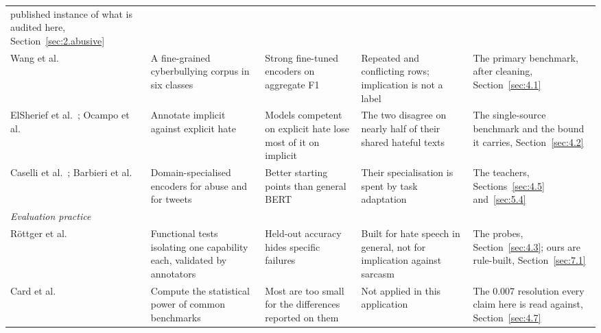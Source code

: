 \begin{center}
{\begin{longtable}{p{2.35cm}p{3.2cm}p{2.4cm}p{3.0cm}p{2.4cm}}
published instance of what is audited here, Section~\ref{sec:2.abusive} \\
Wang et al.\ \cite{wang2020sosnet} & A fine-grained cyberbullying corpus in six classes & Strong
fine-tuned encoders on aggregate F1 & Repeated and conflicting rows; implication is not a label & The
primary benchmark, after cleaning, Section~\ref{sec:4.1} \\
ElSherief et al.\ \cite{elsherief2021latent}; Ocampo et al.\ \cite{ocampo2023indepth} & Annotate
implicit against explicit hate & Models competent on explicit hate lose most of it on implicit & The two
disagree on nearly half of their shared hateful texts & The single-source benchmark and the bound it
carries, Section~\ref{sec:4.2} \\
Caselli et al.\ \cite{caselli2021hatebert}; Barbieri et al.\ \cite{barbieri2020tweeteval} &
Domain-specialised encoders for abuse and for tweets & Better starting points than general BERT & Their
specialisation is spent by task adaptation & The teachers, Sections~\ref{sec:4.5} and~\ref{sec:5.4} \\
\midrule
\multicolumn{5}{l}{\emph{Evaluation practice}} \\*
Röttger et al.\ \cite{rottger2021hatecheck} & Functional tests isolating one capability each, validated
by annotators & Held-out accuracy hides specific failures & Built for hate speech in general, not for
implication against sarcasm & The probes, Section~\ref{sec:4.3}; ours are rule-built,
Section~\ref{sec:7.1} \\
Card et al.\ \cite{card2020power} & Compute the statistical power of common benchmarks & Most are too
small for the differences reported on them & Not applied in this application & The 0.007 resolution
every claim here is read against, Section~\ref{sec:4.7} \\
\end{longtable}
}
\end{center}
